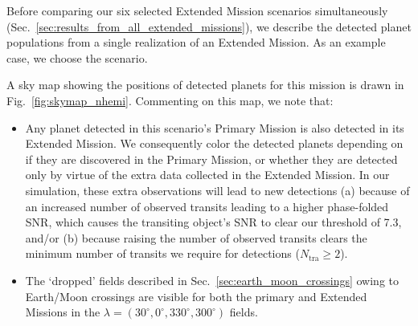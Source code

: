 Before comparing our six selected Extended Mission scenarios simultaneously (Sec.~\ref{sec:results_from_all_extended_missions}), we describe the detected planet populations from a single realization of an Extended Mission.
As an example case, we choose the \npole\:scenario.

A sky map showing the positions of detected planets for this mission is drawn in Fig.~\ref{fig:skymap_nhemi}.
Commenting on this map, we note that:
\begin{itemize}
	\item Any planet detected in this scenario's Primary Mission is also detected in its Extended Mission.
	We consequently color the detected planets depending on if they are discovered in the Primary Mission, or whether they are detected only by virtue of the extra data collected in the Extended Mission.
	In our simulation, these extra observations will lead to new detections (a) because of an increased number of observed transits leading to a higher phase-folded SNR, which causes the transiting object's SNR to clear our threshold of 7.3, and/or (b) because raising the number of observed transits clears the minimum number of transits we require for detections ($N_\mathrm{tra} \geq 2$).
	\item The `dropped' fields described in Sec.~\ref{sec:earth_moon_crossings} owing to Earth/Moon crossings are visible for both the primary and Extended Missions in the $\lambda=(30^\circ, 0^\circ, 330^\circ, 300^\circ)$ fields.
\end{itemize}

